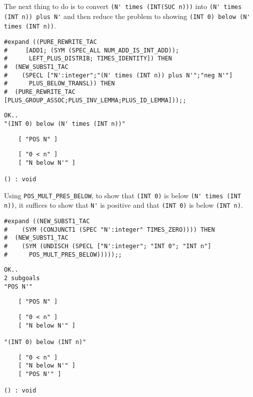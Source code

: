 The next thing to do is to convert {\small\verb+(N' times (INT(SUC n)))+}
into {\small\verb+(N' times (INT n)) plus N'+} and then reduce the
problem to showing {\small\verb+(INT 0) below (N' times (INT n))+}.
\begin{session}
\begin{verbatim}
#expand ((PURE_REWRITE_TAC
#     [ADD1; (SYM (SPEC_ALL NUM_ADD_IS_INT_ADD));
#      LEFT_PLUS_DISTRIB; TIMES_IDENTITY]) THEN
#  (NEW_SUBST1_TAC
#    (SPECL ["N':integer";"(N' times (INT n)) plus N'";"neg N'"]
#      PLUS_BELOW_TRANSL)) THEN
#  (PURE_REWRITE_TAC [PLUS_GROUP_ASSOC;PLUS_INV_LEMMA;PLUS_ID_LEMMA]));;
\end{verbatim}
\mvdots
\begin{verbatim}
OK..
"(INT 0) below (N' times (INT n))"
\end{verbatim}
\mvdots
\begin{verbatim}
    [ "POS N" ]
\end{verbatim}
\mvdots
\begin{verbatim}
    [ "0 < n" ]
    [ "N below N'" ]

() : void
\end{verbatim}
\end{session}

Using {\small\verb+POS_MULT_PRES_BELOW+}, to show that
{\small\verb+(INT 0)+} is below {\small\verb+(N' times (INT n))+}, it
suffices to show that {\small\verb+N'+} is positive and that
{\small\verb+(INT 0)+} is below {\small\verb+(INT n)+}.
\begin{session}
\begin{verbatim}
#expand ((NEW_SUBST1_TAC 
#    (SYM (CONJUNCT1 (SPEC "N':integer" TIMES_ZERO)))) THEN
#  (NEW_SUBST1_TAC
#    (SYM (UNDISCH (SPECL ["N':integer"; "INT 0"; "INT n"]
#      POS_MULT_PRES_BELOW)))));;
\end{verbatim}
\mvdots
\begin{verbatim}
OK..
2 subgoals
"POS N'"
\end{verbatim}
\mvdots
\begin{verbatim}
    [ "POS N" ]
\end{verbatim}
\mvdots
\begin{verbatim}
    [ "0 < n" ]
    [ "N below N'" ]

"(INT 0) below (INT n)"
\end{verbatim}
\mvdots
\begin{verbatim}
    [ "0 < n" ]
    [ "N below N'" ]
    [ "POS N'" ]

() : void
\end{verbatim}
\end{session}

